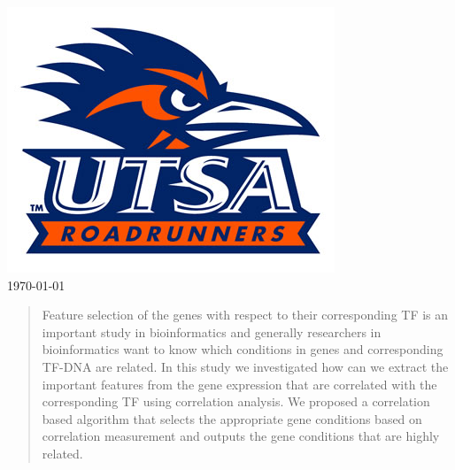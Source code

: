 \begin{titlepage}

\includegraphics{logo.jpg}\\[1cm] %


 {\large \today}\\[2cm] %


\vfill %

\end{titlepage}

\begin{abstract}
Feature selection of the genes with respect to their corresponding TF is an important study in bioinformatics and generally researchers in bioinformatics want to know which conditions in genes and corresponding TF-DNA are related. In this study we investigated how can we extract the important features from the gene expression that are correlated with the corresponding TF using correlation analysis. We proposed a correlation based algorithm that selects the appropriate gene conditions based on correlation measurement and outputs the gene conditions that are highly related. 

\end{abstract}

